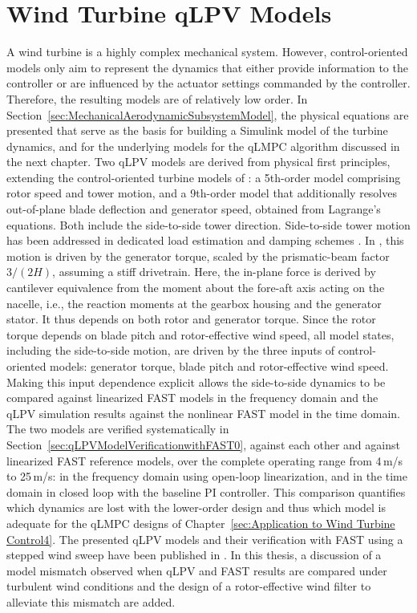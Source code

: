 \chapter{Wind Turbine qLPV Models} \label{sec:WindTurbineqLPVModels}
A wind turbine is a highly complex mechanical system. However, control-oriented models only
aim to represent the dynamics that either provide information to the controller or are influenced
by the actuator settings commanded by the controller. Therefore, the resulting models are of
relatively low order.
%
In Section~\ref{sec:MechanicalAerodynamicSubsystemModel}, the physical equations are presented
that serve as the basis for building a Simulink model of the turbine dynamics, and for the
underlying models for the qLMPC algorithm discussed in the next chapter. Two qLPV models are
derived from physical first principles, extending the control-oriented turbine models of
\cite{schlipf2013nonlinear, Bianchi2007}: a 5th-order model comprising
rotor speed and tower motion, and a 9th-order model that additionally resolves out-of-plane blade
deflection and generator speed, obtained from Lagrange's equations.
%
Both include the side-to-side tower direction. Side-to-side tower motion has been addressed in dedicated load estimation and damping schemes \cite{mulders2020preventing,
    pamososuryo2022loadestimation, pamososuryo2022individual, fonseca2024windTurbineSideSide}. In \cite{selvam2009feedback}, this motion is driven by the generator torque, scaled by the prismatic-beam factor $3/(2H)$, assuming a stiff drivetrain.
    Here, the in-plane force is derived by cantilever equivalence from the moment about the fore-aft
    axis acting on the nacelle, i.e., the reaction moments at the gearbox housing and the generator
    stator. It thus depends on both rotor and generator torque. Since the rotor torque depends on blade pitch and rotor-effective wind speed, all model states, including the side-to-side motion, are driven by the three inputs of control-oriented models: generator torque, blade pitch and rotor-effective wind speed. Making this input dependence explicit allows the side-to-side dynamics to be compared
    against linearized FAST models in the frequency domain and the qLPV simulation results
    against the nonlinear FAST model in the time domain.
%
The two models are verified systematically in
Section~\ref{sec:qLPVModelVerificationwithFAST0}, against each other and against linearized
FAST reference models, over the complete operating range from 4\,m/s to 25\,m/s: in the frequency
domain using open-loop linearization, and in the time domain in closed loop with the
baseline PI controller. This comparison quantifies which dynamics are lost with the lower-order
design and thus which model is adequate for the qLMPC designs of
Chapter~\ref{sec:Application to Wind Turbine Control4}. The presented qLPV models and their verification with FAST using a stepped wind sweep have been published in \cite{dittmer2021velocity}. In this thesis, a discussion of a model mismatch observed when qLPV and FAST results are compared under turbulent wind conditions and the design of a rotor-effective wind filter to alleviate this mismatch are added.


